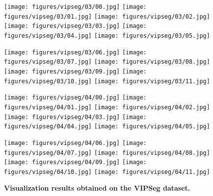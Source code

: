 \documentclass[10pt,twocolumn,letterpaper]{article}
\begin{document}
\begin{figure*}[t]
\begin{minipage}[c]{1.00\linewidth}
\texttt{[image: figures/vipseg/03/00.jpg]}
\texttt{[image: figures/vipseg/03/01.jpg]}
\texttt{[image: figures/vipseg/03/02.jpg]}
\texttt{[image: figures/vipseg/03/03.jpg]}
\texttt{[image: figures/vipseg/03/04.jpg]}
\texttt{[image: figures/vipseg/03/05.jpg]}
\end{minipage}\hfill
\begin{minipage}[c]{1.0\linewidth}
\texttt{[image: figures/vipseg/03/06.jpg]}
\texttt{[image: figures/vipseg/03/07.jpg]}
\texttt{[image: figures/vipseg/03/08.jpg]}
\texttt{[image: figures/vipseg/03/09.jpg]}
\texttt{[image: figures/vipseg/03/10.jpg]}
\texttt{[image: figures/vipseg/03/11.jpg]}
\end{minipage}\hfill\vspace{1mm}

\begin{minipage}[c]{1.00\linewidth}
\texttt{[image: figures/vipseg/04/00.jpg]}
\texttt{[image: figures/vipseg/04/01.jpg]}
\texttt{[image: figures/vipseg/04/02.jpg]}
\texttt{[image: figures/vipseg/04/03.jpg]}
\texttt{[image: figures/vipseg/04/04.jpg]}
\texttt{[image: figures/vipseg/04/05.jpg]}
\end{minipage}\hfill
\begin{minipage}[c]{1.0\linewidth}
\texttt{[image: figures/vipseg/04/06.jpg]}
\texttt{[image: figures/vipseg/04/07.jpg]}
\texttt{[image: figures/vipseg/04/08.jpg]}
\texttt{[image: figures/vipseg/04/09.jpg]}
\texttt{[image: figures/vipseg/04/10.jpg]}
\texttt{[image: figures/vipseg/04/11.jpg]}
\end{minipage}\hfill\vspace{1mm}

\caption{\textbf{Visualization results obtained on the VIPSeg dataset.}}
\label{fig:vipseg demo}
\end{figure*}
\end{document}
